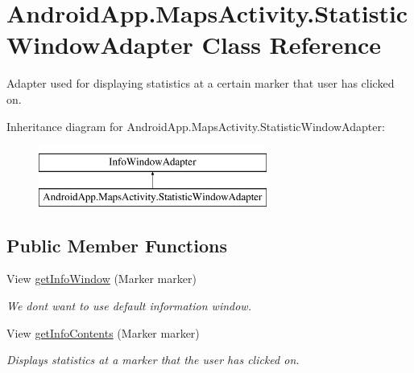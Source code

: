 \hypertarget{class_android_app_1_1_maps_activity_1_1_statistic_window_adapter}{}\section{Android\+App.\+Maps\+Activity.\+Statistic\+Window\+Adapter Class Reference}
\label{class_android_app_1_1_maps_activity_1_1_statistic_window_adapter}


Adapter used for displaying statistics at a certain marker that user has clicked on.  


Inheritance diagram for Android\+App.\+Maps\+Activity.\+Statistic\+Window\+Adapter\+:\begin{figure}[H]
\begin{center}
\leavevmode
\includegraphics[height=2.000000cm]{class_android_app_1_1_maps_activity_1_1_statistic_window_adapter}
\end{center}
\end{figure}
\subsection*{Public Member Functions}
\begin{DoxyCompactItemize}
\item 
\mbox{\label{class_android_app_1_1_maps_activity_1_1_statistic_window_adapter_a14860d57c39c0b2a3d2202aa9c416a59}} 
View \hyperlink{class_android_app_1_1_maps_activity_1_1_statistic_window_adapter_a14860d57c39c0b2a3d2202aa9c416a59}{get\+Info\+Window} (Marker marker)
\begin{DoxyCompactList}\small\item\em We don\textquotesingle{}t want to use default information window. \end{DoxyCompactList}\item 
View \hyperlink{class_android_app_1_1_maps_activity_1_1_statistic_window_adapter_a19ae40ea5994ac2550ec599e3f20268b}{get\+Info\+Contents} (Marker marker)
\begin{DoxyCompactList}\small\item\em Displays statistics at a marker that the user has clicked on. \end{DoxyCompactList}\end{DoxyCompactItemize}


